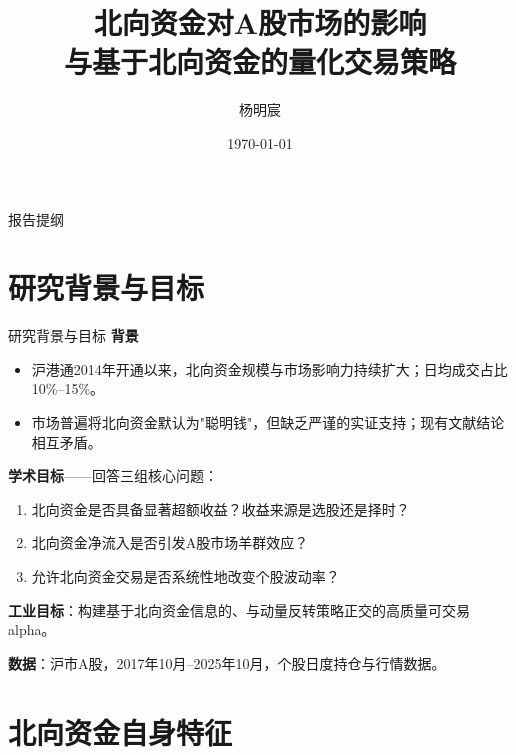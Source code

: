 \documentclass[aspectratio=169, 10pt]{beamer}
\title{北向资金对A股市场的影响\\与基于北向资金的量化交易策略}
\author{杨明宸}
\institute{清华大学}
\date{\today}
\begin{document}
\begin{frame}
\titlepage
\end{frame}

\begin{frame}{报告提纲}
\tableofcontents
\end{frame}

\section{研究背景与目标}

\begin{frame}{研究背景与目标}
\textbf{背景}
\begin{itemize}
    \item 沪港通2014年开通以来，北向资金规模与市场影响力持续扩大；日均成交占比10\%--15\%。
    \item 市场普遍将北向资金默认为"聪明钱"，但缺乏严谨的实证支持；现有文献结论相互矛盾。
\end{itemize}

\vspace{0.5em}
\textbf{学术目标}——回答三组核心问题：
\begin{enumerate}
    \item 北向资金是否具备显著超额收益？收益来源是选股还是择时？
    \item 北向资金净流入是否引发A股市场羊群效应？
    \item 允许北向资金交易是否系统性地改变个股波动率？
\end{enumerate}

\vspace{0.3em}
\textbf{工业目标}：构建基于北向资金信息的、与动量反转策略正交的高质量可交易alpha。

\vspace{0.3em}
\textbf{数据}：沪市A股，2017年10月--2025年10月，个股日度持仓与行情数据。
\end{frame}

\section{北向资金自身特征}
\end{document}
